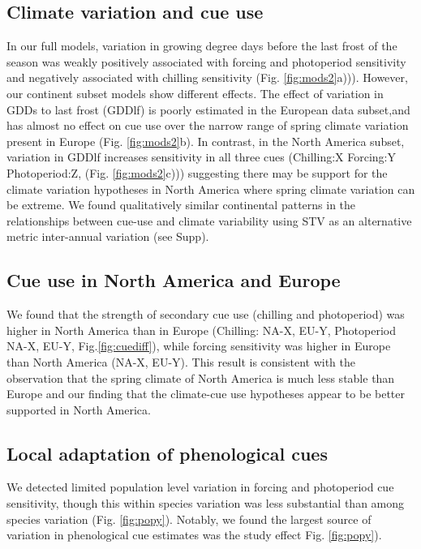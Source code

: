 \documentclass[12pt]{article}
\begin{document}
\subsection*{Climate variation and cue use}
In our full models, variation in growing degree days before the last frost of the season was weakly positively associated with forcing and photoperiod sensitivity and negatively associated with chilling sensitivity (Fig. \ref{fig:mods2}a))). However, our continent subset models show different effects. The effect of variation in GDDs to last frost (GDDlf) is poorly estimated in the European data subset,and has almost no effect on cue use over the narrow range of spring climate variation present in Europe  (Fig. \ref{fig:mods2}b). In contrast, in the North America subset, variation in GDDlf increases sensitivity in all three cues (Chilling:X Forcing:Y Photoperiod:Z, (Fig. \ref{fig:mods2}c))) suggesting there may be support for the climate variation hypotheses in North America where spring climate variation can be extreme. We found qualitatively similar continental patterns in the relationships between cue-use and climate variability using STV as an alternative metric inter-annual variation (see Supp).


\subsection*{Cue use in North America and Europe}
We found that the strength of secondary cue use (chilling and photoperiod) was higher in North America than in Europe (Chilling: NA-X, EU-Y, Photoperiod NA-X, EU-Y, Fig.\ref{fig:cuediff}), while forcing sensitivity was higher in Europe than North America (NA-X, EU-Y). This result is consistent with the observation that the spring climate of North America is much less stable than Europe and our finding that the climate-cue use hypotheses appear to be better supported in North America.

\subsection*{Local adaptation of phenological cues}
We detected limited population level variation in forcing and photoperiod cue sensitivity, though this within species variation was less substantial than among species variation (Fig. \ref{fig:popy}). Notably, we found the largest source of variation in phenological cue estimates was the study effect Fig. \ref{fig:popy}).
\end{document}
